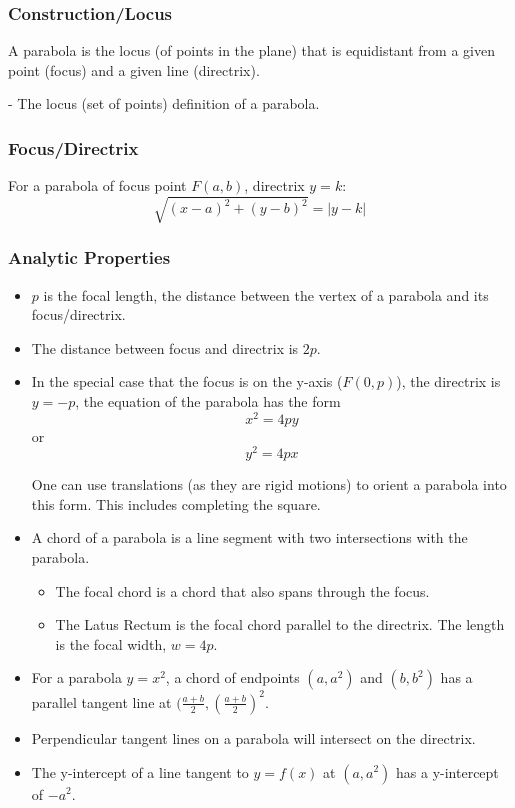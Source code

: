 \documentclass{article}
\begin{document}
\subsubsection{Construction/Locus}
A parabola is the locus (of points in the plane) that is equidistant from a given point (focus) and a given line (directrix).
\begin{flushright}
    - The locus (set of points) definition of a parabola.
\end{flushright}

\subsubsection{Focus/Directrix}
For a parabola of focus point $F(a,b)$, directrix $y=k$:
$$\sqrt{(x-a)^2 + (y-b)^2} = |y-k|$$

\subsubsection{Analytic Properties}
\begin{itemize}
    \item $p$ is the focal length, the distance between the vertex of a parabola and its focus/directrix.
    \item The distance between focus and directrix is $2p$.
    \item In the special case that the focus is on the y-axis ($F(0, p)$), the directrix is $y = -p$, the equation of the parabola has the form $$x^2 = 4py$$ or $$y^2=4px$$
    
    One can use translations (as they are rigid motions) to orient a parabola into this form. This includes completing the square.

    \item A chord of a parabola is a line segment with two intersections with the parabola.
        \begin{itemize}
            \item The focal chord is a chord that also spans through the focus.
            \item The Latus Rectum is the focal chord parallel to the directrix. The length is the focal width, $w = 4p$.
        \end{itemize}

    \item For a parabola $y=x^2$, a chord of endpoints $(a, a^2)$ and $(b, b^2)$ has a parallel tangent line at $(\frac{a+b}{2}, (\frac{a+b}{2})^2$.
    \item Perpendicular tangent lines on a parabola will intersect on the directrix.
    \item The y-intercept of a line tangent to $y=f(x)$ at $(a, a^2)$ has a y-intercept of $-a^2$.
\end{itemize}
\end{document}
